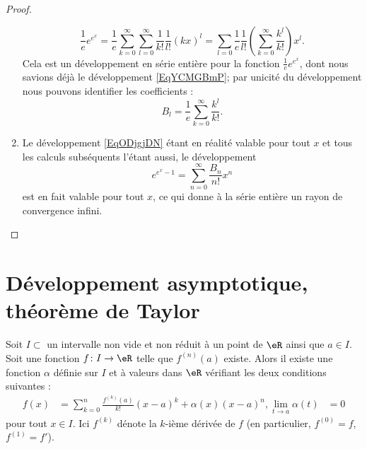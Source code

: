 \begin{proof}
\begin{enumerate}
                    \begin{equation}
                        \frac{1}{ e }e^{e^x}=\frac{1}{ e }\sum_{k=0}^{\infty}\sum_{l=0}^{\infty}\frac{1}{ k! }\frac{1}{ l! }(kx)^l=\sum_{l=0}\frac{1}{ e }\frac{1}{ l! }\left( \sum_{k=0}^{\infty}\frac{ k^l }{ k! } \right)x^l.
                    \end{equation}
                    Cela est un développement en série entière pour la fonction \( \frac{1}{ e } e^{e^x}\), dont nous savions déjà le développement \eqref{EqYCMGBmP}; par unicité du développement nous pouvons identifier les coefficients :
                    \begin{equation}
                        B_l=\frac{1}{ e }\sum_{k=0}^{\infty}\frac{ k^l }{ k! }.
                    \end{equation}
                    
                \item

                    Le développement \eqref{EqODjgjDN} étant en réalité valable pour tout \( x\) et tous les calculs subséquents l'étant aussi, le développement
                    \begin{equation}
                        e^{e^x-1}=\sum_{n=0}^{\infty}\frac{ B_n }{ n! }x^n
                    \end{equation}
                    est en fait valable pour tout \( x\), ce qui donne à la série entière un rayon de convergence infini.
    \end{enumerate}
\end{proof}


\section{Développement asymptotique, théorème de Taylor}
\label{AppSecTaylorR}

\begin{theorem}		\label{ThoTaylor}
Soit $I\subset$ un intervalle non vide et non réduit à un point de $\eR$ ainsi que $a\in I$. Soit une fonction $f\colon I\to \eR$ telle que $f^{(n)}(a)$ existe. Alors il existe une fonction $\alpha$ définie sur $I$ et à valeurs dans $\eR$ vérifiant les deux conditions suivantes :
\begin{subequations}		\label{SubEqsDevTauil}
	\begin{align}
		f(x)&= \sum_{k=0}^n\frac{ f^{(k)}(a) }{ k! }(x-a)^k +\alpha(x)(x-a)^{n},		\label{subeqfTepseqb}
		\lim_{t\to a}\alpha(t)&=0
	\end{align}
\end{subequations}
pour tout \( x\in I\). Ici $f^{(k)}$ dénote la $k$-ième dérivée de $f$ (en particulier, $f^{(0)}=f$, $f^{(1)}=f'$).
\end{theorem}

